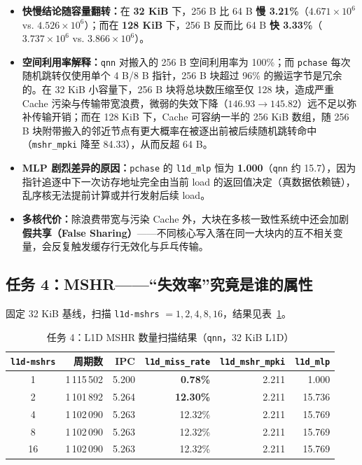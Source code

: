 \documentclass[12pt,a4paper,fontset=mac]{ctexart}
\begin{document}
\begin{itemize}
  \item \textbf{快慢结论随容量翻转：}在 \textbf{32 KiB} 下，256 B 比 64 B \textbf{慢 3.21\%}（$4.671\times10^6$ vs. $4.526\times10^6$）；而在 \textbf{128 KiB} 下，256 B 反而比 64 B \textbf{快 3.33\%}（$3.737\times10^6$ vs. $3.866\times10^6$）。
  \item \textbf{空间利用率解释：}\texttt{qnn} 对搬入的 256 B 空间利用率为 100\%；而 \texttt{pchase} 每次随机跳转仅使用单个 4 B/8 B 指针，256 B 块超过 96\% 的搬运字节是冗余的。在 32 KiB 小容量下，256 B 块将总块数压缩至仅 128 块，造成严重 Cache 污染与传输带宽浪费，微弱的失效下降（$146.93 \to 145.82$）远不足以弥补传输开销；而在 128 KiB 下，Cache 可容纳一半的 256 KiB 数组，随 256 B 块附带搬入的邻近节点有更大概率在被逐出前被后续随机跳转命中（\texttt{mshr\_mpki} 降至 84.33），从而反超 64 B。
  \item \textbf{MLP 剧烈差异的原因：}\texttt{pchase} 的 \texttt{l1d\_mlp} 恒为 \textbf{1.000}（\texttt{qnn} 约 15.7），因为指针追逐中下一次访存地址完全由当前 load 的返回值决定（真数据依赖链），乱序核无法提前计算或并行发射后续 load。
  \item \textbf{多核代价：}除浪费带宽与污染 Cache 外，大块在多核一致性系统中还会加剧\textbf{假共享（False Sharing）}——不同核心写入落在同一大块内的互不相关变量，会反复触发缓存行无效化与乒乓传输。
\end{itemize}

\subsection{任务 4：MSHR——“失效率”究竟是谁的属性}
固定 32 KiB 基线，扫描 \texttt{l1d-mshrs} $= 1, 2, 4, 8, 16$，结果见表~\ref{tab:task4}。

\begin{table}[H]\centering\small
\caption{任务 4：L1D MSHR 数量扫描结果（\texttt{qnn}，32 KiB L1D）}\label{tab:task4}
\begin{tabular}{crrrrr}\toprule
\texttt{l1d-mshrs} & 周期数 & IPC & \texttt{l1d\_miss\_rate} & \texttt{l1d\_mshr\_mpki} & \texttt{l1d\_mlp} \\\midrule
1  & 1\,115\,502 & 5.200 & \textbf{0.78\%}  & 2.211 & 1.000  \\
2  & 1\,101\,892 & 5.264 & \textbf{12.30\%} & 2.211 & 15.736 \\
4  & 1\,102\,090 & 5.263 & 12.32\% & 2.211 & 15.769 \\
8  & 1\,102\,090 & 5.263 & 12.32\% & 2.211 & 15.769 \\
16 & 1\,102\,090 & 5.263 & 12.32\% & 2.211 & 15.769 \\
\bottomrule\end{tabular}
\end{table}
\end{document}
